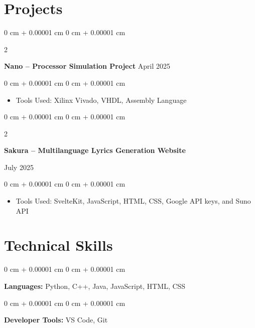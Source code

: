 \documentclass[10pt, letterpaper]{article}
\newenvironment{highlights}{
    \begin{itemize}[
        topsep=0.10 cm,
        parsep=0.10 cm,
        partopsep=0pt,
        itemsep=0pt,
        leftmargin=0 cm + 10pt
    ]
}{
    \end{itemize}
} %
\newenvironment{onecolentry}{
    \begin{adjustwidth}{
        0 cm + 0.00001 cm
    }{
        0 cm + 0.00001 cm
    }
}{
    \end{adjustwidth}
} %
\newenvironment{twocolentry}[2][]{
    \onecolentry
    \def\secondColumn{#2}
    \setcolumnwidth{\fill, 4.5 cm}
    \begin{paracol}{2}
}{
    \switchcolumn \raggedleft \secondColumn
    \end{paracol}
    \endonecolentry
} %
\begin{document}
    
    \section{Projects}



        
        \begin{twocolentry}{
            April 2025 
        }
            \textbf{Nano – Processor Simulation Project }\end{twocolentry}

        \vspace{0.10 cm}
        \begin{onecolentry}
            \begin{highlights}
                \item Tools Used: Xilinx Vivado, VHDL, Assembly Language
            \end{highlights}
        \end{onecolentry}

        \begin{twocolentry}{
            July 2025 
        }
            \textbf{Sakura – Multilanguage Lyrics Generation Website}
\end{twocolentry}

\vspace{0.10 cm}
\begin{onecolentry}
    \begin{highlights}
        \item Tools Used: SvelteKit, JavaScript, HTML, CSS, Google API keys, and Suno API
    \end{highlights}
\end{onecolentry}


    
    \section{Technical Skills}



        
        \begin{onecolentry}
            \textbf{Languages:} Python, C++, Java, JavaScript, HTML, CSS
        \end{onecolentry}

        \vspace{0.2 cm}

        \begin{onecolentry}
            \textbf{Developer Tools:} VS Code, Git
        \end{onecolentry}
\end{document}
